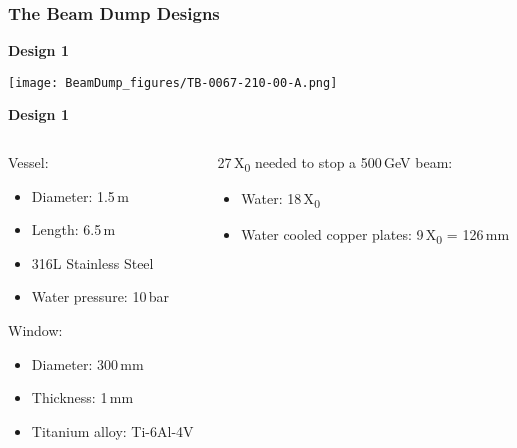 \documentclass[xcolor={dvipsnames}]{beamer}
\begin{document}
\subsubsection{The Beam Dump Designs}
\begin{frame}{\textbf{Design 1}}
\begin{center}
  \texttt{[image: BeamDump\_figures/TB-0067-210-00-A.png]}
\end{center}
\end{frame}
{
\begin{frame}{\textbf{Design 1}}
\begin{columns}
 \begin{column}{0.5\textwidth}
  Vessel:
  \begin{itemize}
   \item Diameter: 1.5\,m
   \item Length: 6.5\,m
   \item 316L Stainless Steel
   \item Water pressure: 10\,bar
  \end{itemize}
  Window:
  \begin{itemize}
   \item Diameter: 300\,mm
   \item Thickness: 1\,mm
   \item Titanium alloy: Ti-6Al-4V 
  \end{itemize}
 \end{column}
 \begin{column}{0.5\textwidth}
  27\,X\textsubscript{0} needed to stop a 500\,GeV beam:
  \begin{itemize}
   \item Water: 18\,X\textsubscript{0}
   \item Water cooled copper plates: 9\,X\textsubscript{0} = 126\,mm
  \end{itemize}  
 \end{column}
\end{columns}

\end{frame}
}
\end{document}
